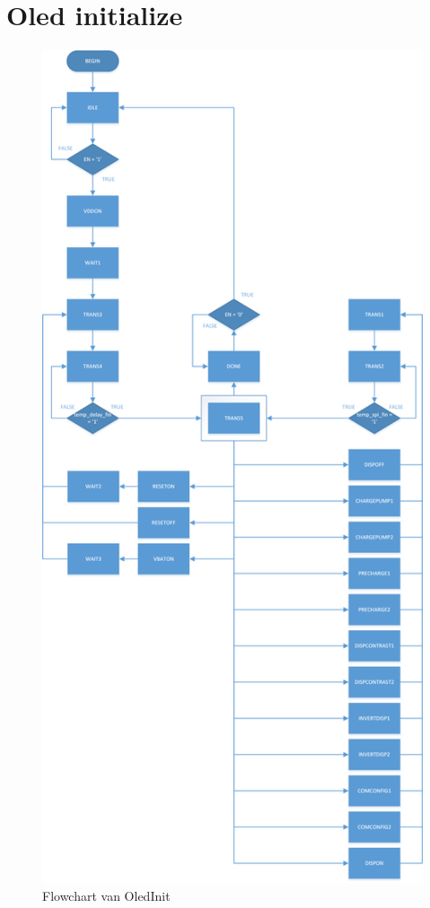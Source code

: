 \newpage
\section{Oled initialize}
\label{sec:appOledInit}
	\begin{figure}[H]
		\centering
		\includegraphics[height=0.85\textheight]{Appendix/FlowCharts/OledInit}
		\caption{Flowchart van OledInit}
		\label{fig:FlowChartOledInit}
	\end{figure}

